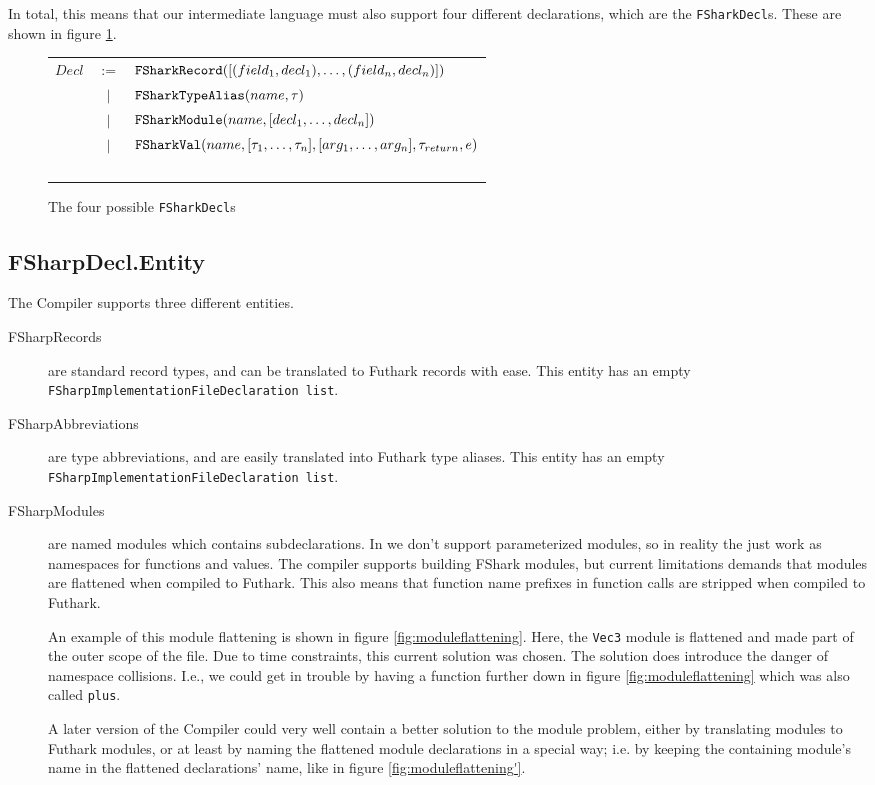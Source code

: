 In total, this means that our intermediate language must also support four
different declarations, which are the \texttt{FSharkDecl}s. These are shown in
figure \ref{fig:fsharkdecls}.

\begin{figure}
  \centering
\begin{tabular}{@{}l c l}%
  $Decl$ & $:=$    & $\text{\ttfamily FSharkRecord}([(field_1, decl_1),\ldots,(field_n, decl_n)])$ \\
         & $\vert$ & $\text{\ttfamily FSharkTypeAlias}(name, \tau)$ \\
         & $\vert$ & $\text{\ttfamily FSharkModule}(name, [decl_1,\ldots, decl_n])$\\
         & $\vert$ & $\text{\ttfamily FSharkVal}(name, [\tau_1, \ldots, \tau_n], [arg_1, \ldots, arg_n], \tau_{return}, e)$\\
  ~ \\
\end{tabular}
\caption{The four possible \texttt{FSharkDecl}s}
\label{fig:fsharkdecls}
\end{figure}

\subsection{FSharpDecl.Entity}
The \fshark{}Compiler supports three different entities.
\begin{description}
\item[FSharpRecords] are standard record types, and can be translated to
  Futhark records with ease.
  This entity has an empty \texttt{FSharpImplementationFileDeclaration list}.
\item[FSharpAbbreviations] are type abbreviations, and are easily translated
  into Futhark type aliases.
  This entity has an empty \texttt{FSharpImplementationFileDeclaration list}.
\item[FSharpModules] are named modules which contains subdeclarations. In
  \fshark{} we don't support parameterized modules, so in reality the just work
  as namespaces for functions and values.
  The \fshark{} compiler supports building FShark modules, but current
  limitations demands that modules are flattened when compiled to Futhark.
  This also means that function name prefixes in function calls are stripped
  when compiled to Futhark.

  An example of this module flattening is shown in
  figure \ref{fig:moduleflattening}. Here, the \texttt{Vec3} module is flattened
  and made part of the outer scope of the file. 
  Due to time constraints, this current solution was chosen.
  The solution does introduce the danger of namespace collisions. I.e.,
  we could get in trouble by having a function further down in figure
  \ref{fig:moduleflattening} which was also called \texttt{plus}.

  A later version of the \fshark{}Compiler could very well contain a better
  solution to the module problem, either by translating \fshark{} modules to
  Futhark modules, or at least by naming the flattened module declarations in a
  special way; i.e. by keeping the containing module's name in the flattened
  declarations' name, like in figure \ref{fig:moduleflattening'}.
\end{description}

